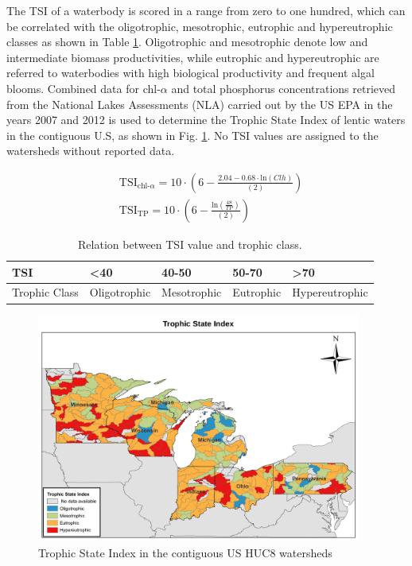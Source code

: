 \documentclass[10pt,a4paper]{article}
\begin{document}
The TSI of a waterbody is scored in a range from zero to one hundred, which can be correlated with the oligotrophic, mesotrophic, eutrophic and hypereutrophic classes as shown in Table \ref{table:TSI_relation}. Oligotrophic and mesotrophic denote low and intermediate biomass productivities, while eutrophic and hypereutrophic are referred to waterbodies with high biological productivity and frequent algal blooms. Combined data for chl-$\alpha$ and total phosphorus concentrations retrieved from the National Lakes Assessments (NLA) carried out by the US EPA in the years 2007 and 2012  is used to determine the Trophic State Index of lentic waters in the contiguous U.S, as shown in Fig. \ref{fig:TSImap}. No TSI values are assigned to the watersheds without reported data.

\begin{align}
	& \text{TSI}_{\text{chl-$\alpha$}} = 10  \cdot \left(6-\frac{2.04-0.68 \cdot \text{ln}\left(Clh\right)}{\left(2\right)}\right) \label{eq:TSI_clh} \\
	& \text{TSI}_{\text{TP}} = 10  \cdot \left(6-\frac{\text{ln}\left(\frac{48}{TP}\right)}{\left(2\right)}\right) \label{eq:TSI_TP}
\end{align}

\begin{table}[H]
	\centering
	\caption{Relation between TSI value and trophic class.}
	\label{table:TSI_relation}
	\begin{tabular}{@{}lllll@{}}
		\toprule
		{TSI}           & \textless 40 & 40-50       & 50-70     & \textgreater{}70 \\ \midrule
		{Trophic Class} & Oligotrophic & Mesotrophic & Eutrophic & Hypereutrophic   \\ \bottomrule
	\end{tabular}
\end{table}

\begin{figure}[H]
	\centering
	\includegraphics[width=0.95\textwidth, trim={0cm 0cm 0cm 0cm},clip]{TrophicStateIndex.pdf} 
	\caption{Trophic State Index in the contiguous US HUC8 watersheds}
	\label{fig:TSImap}
\end{figure}
\end{document}
